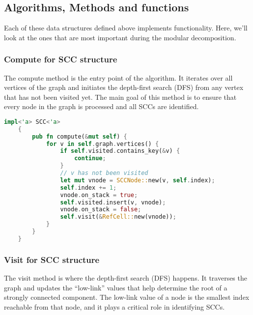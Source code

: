 \subsection{Algorithms, Methods and functions}\label{subsec:algoithms-methods-and-functions}

Each of these data structures defined above implements functionality.
Here, we'll look at the ones that are most important during the modular decomposition.

\subsubsection{Compute for SCC structure}\label{subsubsec:compute-for-scc-structure}

The compute method is the entry point of the algorithm.
It iterates over all vertices of the graph and initiates the depth-first search (DFS) from any vertex that has not been visited yet.
The main goal of this method is to ensure that every node in the graph is processed and all SCCs are identified.

\begin{lstlisting}[language=Rust, style=rust, caption={Defining the TreeNode}, label={lst:rust-define-compute}, firstnumber=1]
    impl<'a> SCC<'a>
    {
        pub fn compute(&mut self) {
            for v in self.graph.vertices() {
                if self.visited.contains_key(&v) {
                    continue;
                }
                // v has not been visited
                let mut vnode = SCCNode::new(v, self.index);
                self.index += 1;
                vnode.on_stack = true;
                self.visited.insert(v, vnode);
                vnode.on_stack = false;
                self.visit(&RefCell::new(vnode));
            }
        }
    }
\end{lstlisting}

\subsubsection{Visit for SCC structure}\label{subsubsec:visit-for-scc-structure}

The visit method is where the depth-first search (DFS) happens.
It traverses the graph and updates the ``low-link” values that help determine the root of a strongly connected component.
The low-link value of a node is the smallest index reachable from that node, and it plays a critical role in identifying SCCs.

